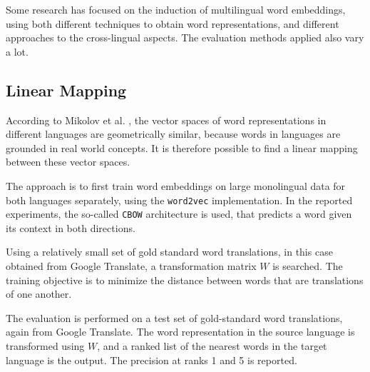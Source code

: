 Some research has focused on the induction of multilingual word embeddings, using both different techniques to obtain word representations, and different approaches to the cross-lingual aspects. The evaluation methods applied also vary a lot.


\subsection{Linear Mapping}\label{s:lin}

According to Mikolov et al. \cite{mikolov2013exploiting}, the vector spaces of word representations in different languages are geometrically similar, because words in languages are grounded in real world concepts.
It is therefore possible to find a linear mapping 
between these vector spaces.

The approach is to first train word embeddings on large monolingual data for both languages separately, using the \texttt{word2vec} implementation. In the reported experiments, the so-called {\tt CBOW} architecture is used, that predicts a word given its context in both directions.

Using a relatively small set of gold standard word translations, in this case obtained from Google Translate, a transformation matrix $W$ is searched. The training objective is to minimize the distance between words that are translations of one another.

The evaluation is performed on a test set of gold-standard word translations, again from Google Translate. The word representation in the source language is transformed using $W$, and a ranked list of the nearest words in the target language is the output. The precision at ranks 1 and 5 is reported.


